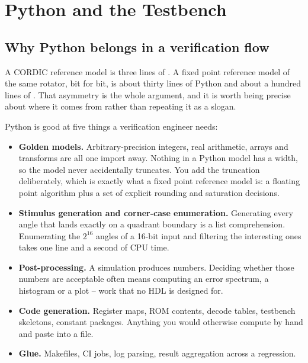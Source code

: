 \chapter{Python and the Testbench}
\label{ch:python}


\section{Why Python belongs in a verification flow}
\label{sec:python:why}

A CORDIC reference model is three lines of . A fixed point
reference model of the same rotator, bit for bit, is about thirty lines of
Python and about a hundred lines of \SV{}. That asymmetry is the whole
argument, and it is worth being precise about where it comes from rather than
repeating it as a slogan.

Python is good at five things a verification engineer needs:

\begin{itemize}
\item \textbf{Golden models.} Arbitrary-precision integers, real
      arithmetic,  arrays and  transforms are all one
      import away. Nothing in a Python model has a width, so the model never
      accidentally truncates. You add the truncation deliberately, which is
      exactly what a fixed point reference model is: a floating point
      algorithm plus a set of explicit rounding and saturation decisions.
\item \textbf{Stimulus generation and corner-case enumeration.} Generating
      every angle that lands exactly on a quadrant boundary is a list
      comprehension. Enumerating the \(2^{16}\) angles of a 16-bit input and
      filtering the interesting ones takes one line and a second of CPU time.
\item \textbf{Post-processing.} A simulation produces numbers. Deciding
      whether those numbers are acceptable often means computing an error
      spectrum, a histogram or a plot -- work that no HDL is designed for.
\item \textbf{Code generation.} Register maps, ROM contents, decode tables,
      testbench skeletons, constant packages. Anything you would otherwise
      compute by hand and paste into a file.
\item \textbf{Glue.} Makefiles, CI jobs, log parsing, result aggregation
      across a regression.
\end{itemize}

